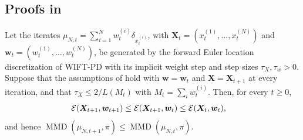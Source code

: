 \subsection{Proofs in } 
\begin{prop}
\label{prop:wift-monotone-descent}
Let the iterates $\mu_{N,t}=\sum_{i=1}^N w_t^{(i)}\delta_{x_t^{(i)}}$, with $\bm{X}_t=(x_t^{(1)},\ldots,x_t^{(N)})$ and $\bm{w}_t=(w_t^{(1)},\ldots,w_t^{(N)})$, be generated by the forward Euler location discretization of WIFT-PD with its implicit weight step and step sizes $\tau_X,\tau_w>0$. Suppose that the assumptions of  hold with $\bm{w}=\bm{w}_t$ and $\bm{X}=\bm{X}_{t+1}$ at every iteration, and that $\tau_X\leq 2/L(M_t)$ with $M_t=\sum_iw_t^{(i)}$. Then, for every $t\geq0$,
\begin{align*}
\mathcal{E}(\bm{X}_{t+1},\bm{w}_{t+1})
&\leq \mathcal{E}(\bm{X}_{t+1},\bm{w}_t)
\leq \mathcal{E}(\bm{X}_t,\bm{w}_t),
\end{align*}
and hence $\operatorname{MMD}(\mu_{N,t+1},\pi)\leq\operatorname{MMD}(\mu_{N,t},\pi)$.
\end{prop}

